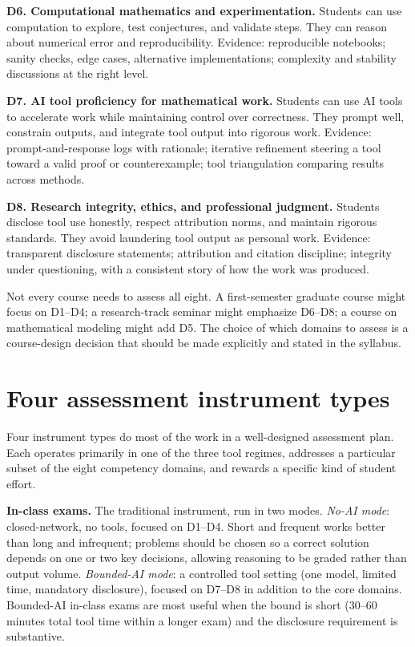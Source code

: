 \documentclass[11pt]{book}
\begin{document}
\textbf{D6. Computational mathematics and experimentation.} Students can use computation to explore, test conjectures, and validate steps. They can reason about numerical error and reproducibility. Evidence: reproducible notebooks; sanity checks, edge cases, alternative implementations; complexity and stability discussions at the right level.

\textbf{D7. AI tool proficiency for mathematical work.} Students can use AI tools to accelerate work while maintaining control over correctness. They prompt well, constrain outputs, and integrate tool output into rigorous work. Evidence: prompt-and-response logs with rationale; iterative refinement steering a tool toward a valid proof or counterexample; tool triangulation comparing results across methods.

\textbf{D8. Research integrity, ethics, and professional judgment.} Students disclose tool use honestly, respect attribution norms, and maintain rigorous standards. They avoid laundering tool output as personal work. Evidence: transparent disclosure statements; attribution and citation discipline; integrity under questioning, with a consistent story of how the work was produced.

Not every course needs to assess all eight. A first-semester graduate course might focus on D1--D4; a research-track seminar might emphasize D6--D8; a course on mathematical modeling might add D5. The choice of which domains to assess is a course-design decision that should be made explicitly and stated in the syllabus.

\section{Four assessment instrument types}

Four instrument types do most of the work in a well-designed assessment plan. Each operates primarily in one of the three tool regimes, addresses a particular subset of the eight competency domains, and rewards a specific kind of student effort.

\textbf{In-class exams.} The traditional instrument, run in two modes. \emph{No-AI mode}: closed-network, no tools, focused on D1--D4. Short and frequent works better than long and infrequent; problems should be chosen so a correct solution depends on one or two key decisions, allowing reasoning to be graded rather than output volume. \emph{Bounded-AI mode}: a controlled tool setting (one model, limited time, mandatory disclosure), focused on D7--D8 in addition to the core domains. Bounded-AI in-class exams are most useful when the bound is short (30--60 minutes total tool time within a longer exam) and the disclosure requirement is substantive.
\end{document}
